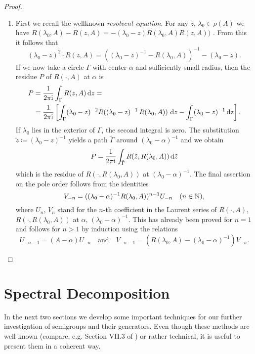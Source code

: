 \begin{proof}
\begin{enumerate}[\upshape (i), wide, labelsep=.5em]
\item 
First we recall the wellknown \emph{resolvent equation}. For any $z$,  $\lambda_{0} \in \rho(A)$ we have $R(\lambda_{0},A) - R(z,A)= -(\lambda_{0}-z)R(\lambda_{0},A)R(z,A))$ . From this it follows that 
%
\[
	(\lambda_{0}-z)^2\cdot R(z,A) = \left((\lambda_{0}-z)^{-1}-R(\lambda_{0},A)\right)^{-1} - (\lambda_{0}-z).
\]
%
If we now take a circle $\Gamma$ with center $\alpha$ and sufficiently small radius, then the residue $P$ of $R(\cdot,A)$ at $\alpha$ is
\begin{align*}
P &=  \frac{1}{2\pi\mathrm{i} } \int_{\Gamma} R(z,A)   \mathop{}\!\mathrm{d}{z} = \\
&=  \frac{1}{2\pi\mathrm{i} } \left[\int_{\Gamma} (\lambda_{0}-z)^{-2}R((\lambda_{0}-z)^{-1}\,R(\lambda_{0},A)) \, \mathop{}\!\mathrm{d}{z}   - 
   \int_{\Gamma}(\lambda_{0}-z)^{-1} \mathop{}\!\mathrm{d}{z} \right] . 
\end{align*}
If $\lambda_{0}$ lies in the exterior of $\Gamma$, the second integral is zero.
The substitution $\tilde{z} \coloneqq (\lambda_{0} - z)^{-1}$ yields a path $\tilde{\Gamma}$ around $(\lambda_{0}-\alpha)^{-1}$ and we obtain
\[
P = \frac{1}{2\pi\mathrm{i} } \int_{\tilde{\Gamma}} R(\tilde{z},R(\lambda_{0},A)) \, \mathrm{d}\tilde{z}
\]
which is the residue of $R(\cdot,R(\lambda_{0},A))$ at $(\lambda_{0}-\alpha)^{-1}$.
The final assertion on the pole order follows from the identities
\[
V_{-n} = ((\lambda_{0}-\alpha)^{-1}R(\lambda_{0},A))^{n-1}U_{-n} \quad (n \in \mathbb{N}) ,
\]
where $U_{n}$, \resp $V_{n}$ stand for the $ n $-th coefficient in the Laurent series of $R(\cdot,A)$, \resp $R(\cdot,R(\lambda_{0},A))$ at $\alpha$, \resp $(\lambda_{0}-\alpha)^{-1}$.
This has already been proved for $n = 1$ and follows for $n > 1$ by induction using the relations
\[
U_{-n-1} = (A - \alpha)U_{-n} 
\quad \text{and} \quad 
V_{-n-1} = \left(R(\lambda_{0},A) - (\lambda_{0}-\alpha)^{-1}\right)V_{-n} .
\]
\end{enumerate}
\end{proof}
\section{Spectral Decomposition}\label{sec:a3-3}
In the next two sections we develop some important techniques for our further investigation of semigroups and their generators.
Even though these methods are well known (compare, e.g. Section VII.3 of \citet{dunfordschwartz:1958}) or rather technical, it is useful to present them in a coherent way.

